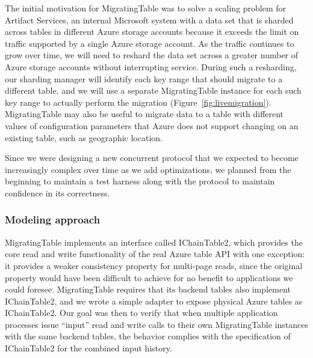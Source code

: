 The initial motivation for MigratingTable was to solve a scaling problem for Artifact Services, an internal Microsoft system with a data set that is sharded across tables in different Azure storage accounts because it exceeds the limit on traffic supported by a single Azure storage account.  As the traffic continues to grow over time, we will need to reshard the data set across a greater number of Azure storage accounts without interrupting service.  During such a resharding, our sharding manager will identify each key range that should migrate to a different table, and we will use a separate MigratingTable instance for each such key range to actually perform the migration (Figure~\ref{fig:livemigration}).  MigratingTable may also be useful to migrate data to a table with different values of configuration parameters that Azure does not support changing on an existing table, such as geographic location.

Since we were designing a new concurrent protocol that we expected to become increasingly complex over time as we add optimizations, we planned from the beginning to maintain a \psharp test harness along with the protocol to maintain confidence in its correctness.

\subsubsection{Modeling approach}

MigratingTable implements an interface called IChainTable2, which provides the core read and write functionality of the real Azure table API with one exception: it provides a weaker consistency property for multi-page reads, since the original property would have been difficult to achieve for no benefit to applications we could foresee.  MigratingTable requires that its backend tables also implement IChainTable2, and we wrote a simple adapter to expose physical Azure tables as IChainTable2.  Our goal was then to verify that when multiple application processes issue ``input'' read and write calls to their own MigratingTable instances with the same backend tables, the behavior complies with the specification of IChainTable2 for the combined input history.

